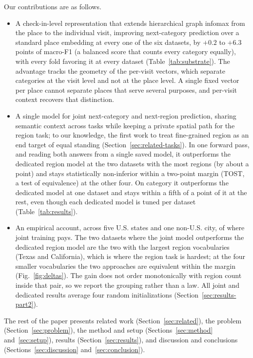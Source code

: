 Our contributions are as follows.
\begin{itemize}
  \item A check-in-level representation that extends hierarchical graph infomax from the place to the individual visit, improving next-category prediction over a standard place embedding at every one of the six datasets, by $+0.2$ to $+6.3$ points of macro-F1 (a balanced score that counts every
    category equally), with every fold favoring it at every dataset (Table~\ref{tab:substrate}). The advantage tracks the geometry of the per-visit
    vectors, which separate categories at the visit level and not at the place level. A single fixed vector
    per place cannot separate places that serve several purposes, and
    per-visit context recovers that distinction.
  \item A single model for joint next-category and next-region prediction, sharing semantic context across tasks while keeping a private spatial path for the region task; to our knowledge, the first work to treat fine-grained region as an end target of equal standing (Section~\ref{sec:related-tasks}). In one forward pass, and reading both answers from a single saved model, it outperforms the dedicated
    region model at the two datasets with the most regions (by about a point) and stays
    statistically non-inferior within a two-point margin (TOST, a test of
    equivalence) at the other four. On category it outperforms the dedicated model at one
    dataset and stays within a fifth of a point of it at the rest, even though each
    dedicated model is tuned per dataset (Table~\ref{tab:results}).
  \item An empirical account, across five U.S. states and one non-U.S. city, of where joint training pays.
    The two datasets where the joint model outperforms the dedicated region model are the two with the
    largest region vocabularies (Texas and California), which is where the region task is hardest;
    at the four smaller vocabularies the two approaches are equivalent within the margin
    (Fig.~\ref{fig:deltas}). The gain does not order monotonically with region count inside that
    pair, so we report the grouping rather than a law. All joint and dedicated results average
    four random initializations (Section~\ref{sec:results-part2}).
\end{itemize}

The rest of the paper presents related work (Section~\ref{sec:related}), the problem (Section~\ref{sec:problem}), the method and setup (Sections~\ref{sec:method} and~\ref{sec:setup}), results (Section~\ref{sec:results}), and discussion and conclusions (Sections~\ref{sec:discussion} and~\ref{sec:conclusion}).
